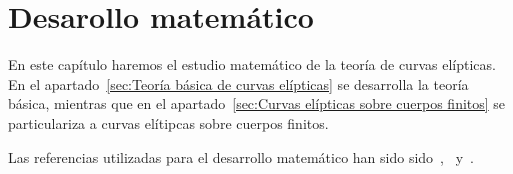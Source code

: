 \chapter{Desarollo matemático}
\label{ch:Desarollo matemático}



En este capítulo haremos el estudio matemático de la teoría de curvas elípticas. En el apartado~\ref{sec:Teoría básica de curvas elípticas} se desarrolla la teoría básica, mientras que en el apartado~\ref{sec:Curvas elípticas sobre cuerpos finitos} se particulariza a curvas elítipcas sobre cuerpos finitos. %

Las referencias utilizadas para el desarrollo matemático han sido sido~\cite{Washington:2008},~\cite{Hankerson:2003} y~\cite{Silverman:2009}.




